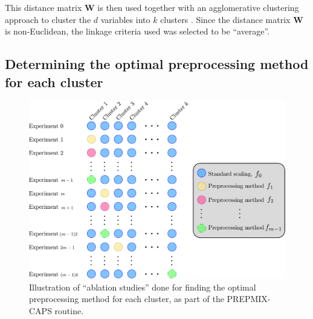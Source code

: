 \documentclass{statsmsc}
\begin{document}
This distance matrix $\mathbf{W}$ is then used together with an agglomerative clustering approach
to cluster the $d$ variables into $k$ clusters
\citep{hierarchical_clustering}. Since the distance matrix $\mathbf{W}$ is
non-Euclidean, the linkage criteria used was selected to be ``average''.


\subsection{Determining the optimal preprocessing method for each cluster}%
\label{sub:Determining the optimal preprocessing method for each clusterch cluster}

\begin{figure}
    \begin{center}
        \includegraphics[width=\textwidth]{diagrams/prepmix-diagram.pdf}
    \end{center}
    \caption{Illustration of ``ablation studies'' done for finding the optimal preprocessing method
    for each cluster, as part of the \ac{PREPMIX-CAPS} routine.}
    \label{fig:prepmix}
\end{figure}

\end{document}
